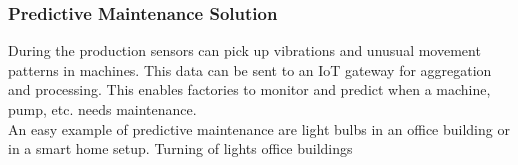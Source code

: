 \subsubsection{Predictive Maintenance Solution}
During the production sensors can pick up vibrations and unusual movement patterns in machines. This data can be sent to an IoT gateway for aggregation and processing. This enables factories to monitor and predict when a machine, pump, etc. needs maintenance.\\
An easy example of predictive maintenance are light bulbs in an office building or in a smart home setup. 
Turning of lights
office buildings

